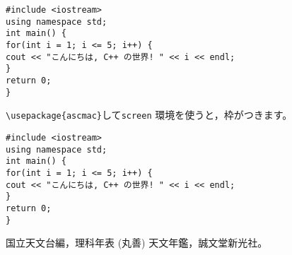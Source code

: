 \documentclass[a4paper,12pt]{jreport}
\begin{document}
\begin{verbatim}
#include <iostream>
using namespace std;
int main() {
for(int i = 1; i <= 5; i++) {
cout << "こんにちは, C++ の世界! " << i << endl;
}
return 0;
}
\end{verbatim}
\verb|\usepackage{ascmac}|して\verb|screen| 環境を使うと，枠がつきます。
\begin{screen}
\begin{verbatim}
#include <iostream>
using namespace std;
int main() {
for(int i = 1; i <= 5; i++) {
cout << "こんにちは, C++ の世界! " << i << endl;
}
return 0;
}
\end{verbatim}
\end{screen}

\begin{thebibliography}{99}
   国立天文台編，理科年表 (丸善)
   天文年鑑，誠文堂新光社。
  \end{thebibliography}
  
  
\end{document}
